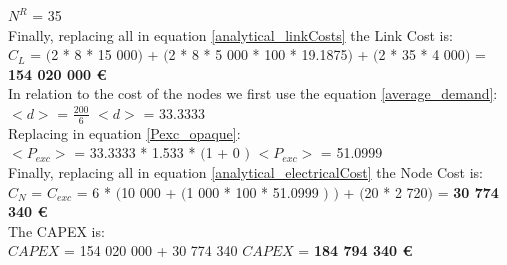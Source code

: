 $N^R$ = 35\\

Finally, replacing all in equation \ref{analytical_linkCosts} the Link Cost is:\\

$C_L$ = $($2 * 8 * 15 000$)$ + $($2 * 8 * 5 000 * 100 * 19.1875$)$ + $($2 * 35 * 4 000$)$ = \textbf{154 020 000 \euro}\\

In relation to the cost of the nodes we first use the equation \ref{average_demand}:\\

$<d>$ = $\frac{200}{6}$ \qquad \qquad $<d>$ = 33.3333\\

Replacing in equation \ref{Pexc_opaque}:\\

$<P_{exc}>$ = 33.3333 * 1.533 * $($1 + $0$ $)$ \qquad \qquad $<P_{exc}>$ = 51.0999 \\

Finally, replacing all in equation \ref{analytical_electricalCost} the Node Cost is:\\

$C_N$ = $C_{exc}$ = 6 * $($10 000 + $($1 000 * 100 * 51.0999 $)$ $)$ + $($20 * 2 720$)$ = \textbf{30 774 340 \euro}\\

The CAPEX is:\\

$CAPEX$ = 154 020 000 + 30 774 340 \qquad \qquad $CAPEX$ = \textbf{184 794 340 \euro}

